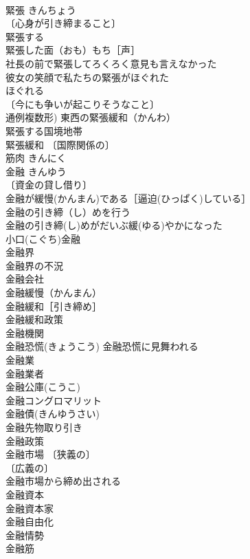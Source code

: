 \documentclass[8pt]{extreport}
\begin{document}
\begin{CJK}{UTF8}{min}
\\	緊張	きんちょう	
\\	〔心身が引き締まること〕
\\	緊張する 
\\	緊張した面（おも）もち［声］ 
\\	社長の前で緊張してろくろく意見も言えなかった 
\\	彼女の笑顔で私たちの緊張がほぐれた 
\\	ほぐれる　
\\	〔今にも争いが起こりそうなこと〕
\\	通例複数形) 東西の緊張緩和（かんわ） 
\\	緊張する国境地帯 
\\	緊張緩和 〔国際関係の〕
\\	筋肉	きんにく	
\\	金融	きんゆう	
\\	〔資金の貸し借り〕
\\	金融が緩慢(かんまん)である［逼迫(ひっぱく)している］ 
\\	金融の引き締（し）めを行う 
\\	金融の引き締(し)めがだいぶ緩(ゆる)やかになった 
\\	小口(こぐち)金融 
\\	金融界 
\\	金融界の不況 
\\	金融会社 
\\	金融緩慢（かんまん） 
\\	金融緩和［引き締め］ 
\\	金融緩和政策 
\\	金融機関 
\\	金融恐慌(きょうこう) 金融恐慌に見舞われる 
\\	金融業 
\\	金融業者 
\\	金融公庫(こうこ) 
\\	金融コングロマリット 
\\	金融債(きんゆうさい) 
\\	金融先物取り引き 
\\	金融政策 
\\	金融市場 〔狭義の〕
\\	〔広義の〕
\\	金融市場から締め出される 
\\	金融資本 
\\	金融資本家 
\\	金融自由化 
\\	金融情勢 
\\	金融筋 

\end{CJK}
\end{document}
